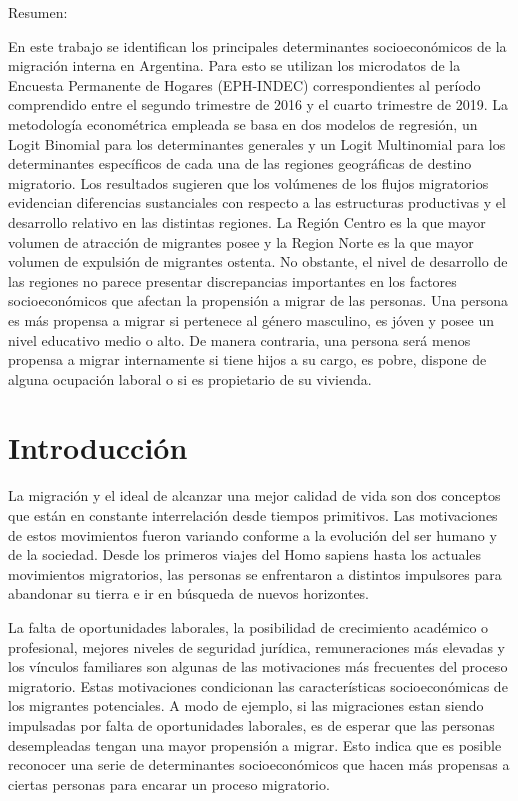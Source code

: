 \documentclass[12pt,a4paper]{article}
\begin{document}
\newpage
\begin{center}
Resumen:
\end{center}
En este trabajo se identifican los principales determinantes socioeconómicos de la migración interna en Argentina. Para esto se utilizan los microdatos de la Encuesta Permanente de Hogares (EPH-INDEC) correspondientes al período comprendido entre el segundo trimestre de 2016 y el cuarto trimestre de 2019. La metodología econométrica empleada se basa en dos modelos de regresión, un Logit Binomial para los determinantes generales y un Logit Multinomial para los determinantes específicos de cada una de las regiones geográficas de destino migratorio. Los resultados sugieren que los volúmenes de los flujos migratorios evidencian diferencias sustanciales con respecto a las estructuras productivas y el desarrollo relativo en las distintas regiones. La Región Centro es la que mayor volumen de atracción de migrantes posee y la Region Norte es la que mayor volumen de expulsión de migrantes ostenta. No obstante, el nivel de desarrollo de las regiones no parece presentar discrepancias importantes en los factores socioeconómicos que afectan la propensión a migrar de las personas. Una persona es más propensa a migrar si  pertenece al género masculino, es jóven y posee un nivel educativo medio o alto. De manera contraria, una persona será menos propensa a migrar internamente si tiene hijos a su cargo,  es pobre, dispone de alguna ocupación laboral o si es propietario de su vivienda. 
\newpage
\tableofcontents
\newpage
\section{Introducción}

La migración y el ideal de alcanzar una mejor calidad de vida son dos conceptos que están en constante interrelación desde tiempos primitivos. Las motivaciones de estos movimientos fueron variando conforme a la evolución del ser humano y de la sociedad. Desde los primeros viajes del Homo sapiens hasta los actuales movimientos migratorios, las personas se enfrentaron a distintos impulsores para abandonar su tierra e ir en búsqueda de nuevos horizontes. 

La falta de oportunidades laborales, la posibilidad de crecimiento académico o profesional, mejores niveles de seguridad jurídica, remuneraciones más elevadas y los vínculos familiares son algunas de las motivaciones más frecuentes del proceso migratorio. Estas motivaciones condicionan las características socioeconómicas de los migrantes potenciales. A modo de ejemplo, si las migraciones estan siendo impulsadas por falta de oportunidades laborales, es de esperar que las personas desempleadas tengan una mayor propensión a migrar. Esto indica que es posible reconocer una serie de determinantes socioeconómicos que hacen más propensas a ciertas personas para encarar un proceso migratorio. 
\end{document}
